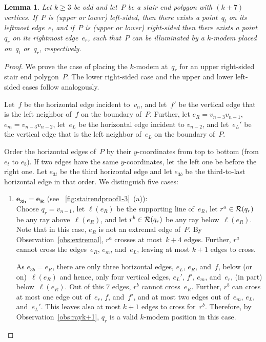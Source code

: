 \documentclass[A4]{article}
\newtheorem{lemma}[theorem]{Lemma}
\begin{document}
\begin{lemma}\label{lem:k+7}
Let $k\geq 3$ be odd and let~$P$ be a stair end polygon with $(k+7)$ vertices.
If~$P$ is (upper or lower) left-sided, then there exists a point~$q_l$ on its leftmost edge~$e_l$ and if~$P$ is (upper or lower) right-sided then there exists a point~$q_r$ on its rightmost edge~$e_r$, such that~$P$ can be illuminated by a \mbox{$k$-modem} placed on~$q_l$ or~$q_r$, respectively.
\end{lemma}
\begin{proof}
We prove the case of placing the \mbox{$k$-modem} at~$q_r$ for an upper right-sided stair end polygon~$P$.
The lower right-sided case and the upper and lower left-sided cases follow analogously.

Let~$f$ be the horizontal edge incident to~$v_n$, and let~$f'$ be the vertical edge that is the left neighbor of~$f$ on the boundary of~$P$.
Further, let $e_R=v_{n-3}v_{n-1}$, $e_m=v_{n-3}v_{n-2}$, let~$e_L$ be the horizontal edge incident to $v_{n-2}$, and let~$e_L'$ be the vertical edge that is the left neighbor of~$e_L$ on the boundary of~$P$.

Order the horizontal edges of~$P$ by their $y$-coordinates from top to bottom (from $e_t$ to $e_b$).
If two edges have the same $y$-coordinates, let the left one be before the right one.
Let $e_{3t}$ be the third horizontal edge and let $e_{3b}$ be the third-to-last horizontal edge in that order.
We distinguish five cases:

\begin{enumerate}
\item \textbf{$\mathbf{e_{3b}=e_R}$} (see \figurename~\ref{fig:stairendproof1-3}~(a)):\\
Choose $q_r=v_{n-1}$, let $\ell(e_R)$ be the supporting line of~$e_R$, let $r^a\in{\cal R}(q_r)$ be any ray above~$\ell(e_R)$, and let $r^b\in{\cal R}(q_r)$ be any ray below~$\ell(e_R)$.
Note that in this case, $e_R$ is not an extremal edge of~$P$. 
By Observation~\ref{obs:extremal}, $r^a$ crosses at most~$k+4$ edges.
Further, $r^a$ cannot cross the edges~$e_R$, $e_m$, and~$e_L$, leaving at most $k+1$ edges to cross.

As $e_{3b}=e_R$, there are only three horizontal edges, $e_L$, $e_R$, and~$f$, below (or on)~$\ell(e_R)$ and hence, only four vertical edges, $e_L'$, $f'$, $e_m$, and~$e_r$, (in part) below~$\ell(e_R)$. 
Out of this $7$ edges, $r^b$ cannot cross~$e_R$.
Further, $r^b$ can cross at most one edge out of~$e_r$, $f$, and~$f'$, and at most two edges out of~$e_m$, $e_L$, and~$e_L'$.
This leaves also at most $k+1$ edges to cross for~$r^b$.
Therefore, by Observation~\ref{obs:rayk+1}, $q_r$ is a valid \mbox{$k$-modem} position in this case.


\end{enumerate}
\end{proof}
\end{document}
